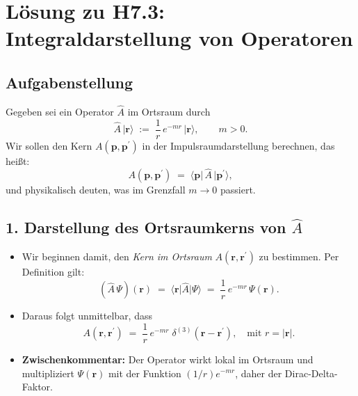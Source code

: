 \documentclass{scrartcl}
\begin{document}
\section*{Lösung zu H7.3: Integraldarstellung von Operatoren}

\subsection*{Aufgabenstellung}
Gegeben sei ein Operator $\hat{A}$ im Ortsraum durch
\[
\hat{A}\,\lvert \boldsymbol{r} \rangle \;:=\; \frac{1}{r}\,e^{-m r}\,\lvert \boldsymbol{r} \rangle,\qquad m>0.
\]
Wir sollen den Kern $A(\boldsymbol{p},\boldsymbol{p}^{\prime})$ in der Impulsraumdarstellung berechnen, das heißt:
\[
A(\boldsymbol{p},\boldsymbol{p}^{\prime})
\;=\;
\langle \boldsymbol{p}\rvert\,\hat{A}\,\lvert \boldsymbol{p}^{\prime}\rangle,
\]
und physikalisch deuten, was im Grenzfall $m \to 0$ passiert.

\subsection*{1. Darstellung des Ortsraumkerns von $\hat{A}$}
\begin{itemize}
  \item Wir beginnen damit, den \emph{Kern im Ortsraum} $A(\boldsymbol{r},\boldsymbol{r}^{\prime})$ zu bestimmen. Per Definition gilt:
  \[
    (\hat{A}\,\Psi)(\boldsymbol{r})
    \;=\; \langle \boldsymbol{r}\rvert \hat{A} \lvert \Psi \rangle
    \;=\; \frac{1}{r}\,e^{-m r}\,\Psi(\boldsymbol{r}).
  \]
  \item Daraus folgt unmittelbar, dass
  \[
    A(\boldsymbol{r},\boldsymbol{r}^{\prime})
    \;=\;
    \frac{1}{r}\,e^{-m r}\;\delta^{(3)}(\boldsymbol{r} - \boldsymbol{r}^{\prime}),
    \quad\text{mit }r = |\boldsymbol{r}|.
  \]
  \item \textbf{Zwischenkommentar:} 
    Der Operator wirkt lokal im Ortsraum und multipliziert $\Psi(\boldsymbol{r})$ mit der Funktion $(1/r)e^{-m r}$, daher der Dirac-Delta-Faktor.
\end{itemize}

\end{document}
